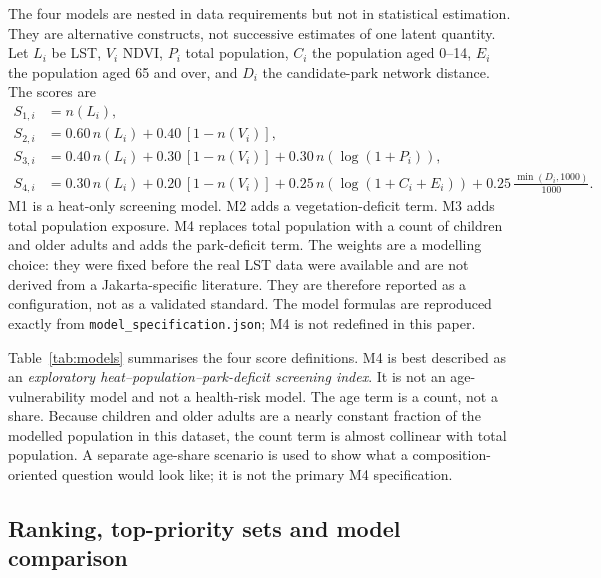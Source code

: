 \documentclass[times,twoside]{_Templates/MultiTargetManuscript}
\begin{document}
The four models are nested in data requirements but not in statistical
estimation. They are alternative constructs, not successive estimates of one
latent quantity. Let $L_i$ be LST, $V_i$ NDVI, $P_i$ total population,
$C_i$ the population aged 0--14, $E_i$ the population aged 65 and over, and
$D_i$ the candidate-park network distance. The scores are
\begin{align}
S_{1,i} &= n(L_i), \label{eq:m1}\\
S_{2,i} &= 0.60\,n(L_i) + 0.40\,[1-n(V_i)], \label{eq:m2}\\
S_{3,i} &= 0.40\,n(L_i) + 0.30\,[1-n(V_i)]
          + 0.30\,n(\log(1+P_i)), \label{eq:m3}\\
S_{4,i} &= 0.30\,n(L_i) + 0.20\,[1-n(V_i)]
          + 0.25\,n(\log(1+C_i+E_i))
          + 0.25\,\frac{\min(D_i,1000)}{1000}. \label{eq:m4}
\end{align}
M1 is a heat-only screening model. M2 adds a vegetation-deficit term. M3 adds
total population exposure. M4 replaces total population with a count of children
and older adults and adds the park-deficit term. The weights are a modelling
choice: they were fixed before the real LST data were available and are not
derived from a Jakarta-specific literature. They are therefore reported as a
configuration, not as a validated standard. The model formulas are reproduced
exactly from \texttt{model\_specification.json}; M4 is not redefined in this
paper.

Table~\ref{tab:models} summarises the four score definitions.
M4 is best described as an \emph{exploratory heat--population--park-deficit
screening index}. It is not an age-vulnerability model and not a health-risk
model. The age term is a count, not a share. Because children and older adults
are a nearly constant fraction of the modelled population in this dataset, the
count term is almost collinear with total population. A separate age-share
scenario is used to show what a composition-oriented question would look like;
it is not the primary M4 specification.



\subsection{Ranking, top-priority sets and model comparison}
\end{document}

